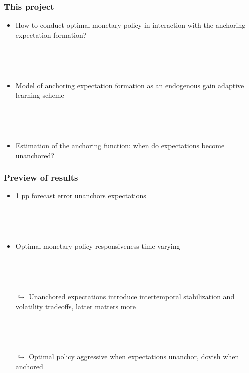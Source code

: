 \documentclass[10pt]{beamer}
\def\ppFEunanchors{1 }
\begin{document}
\begin{frame}
	\frametitle{This project}
	
	\begin{itemize}
	\item How to conduct optimal monetary policy in interaction with the anchoring expectation formation?
	
	\
	
	\

	\item Model of anchoring expectation formation as an endogenous gain adaptive learning scheme
	
	\
	
	\
	
	\item Estimation of the anchoring function: when do expectations become unanchored?

	\end{itemize}
	\end{frame}
\begin{frame}
	\frametitle{Preview of results}
	
	\begin{itemize}
	\item \ppFEunanchors pp forecast error unanchors expectations

	
	\
	
	\
	
	\item Optimal monetary policy responsiveness time-varying 
	
	\
	
	\
	
	
	\item[$\hookrightarrow$] Unanchored expectations introduce intertemporal stabilization and volatility tradeoffs, latter matters more 
	
	\
	
	\
	\item[$\hookrightarrow$] Optimal policy aggressive when expectations unanchor, dovish when anchored

	\end{itemize}


\end{frame}
\end{document}
